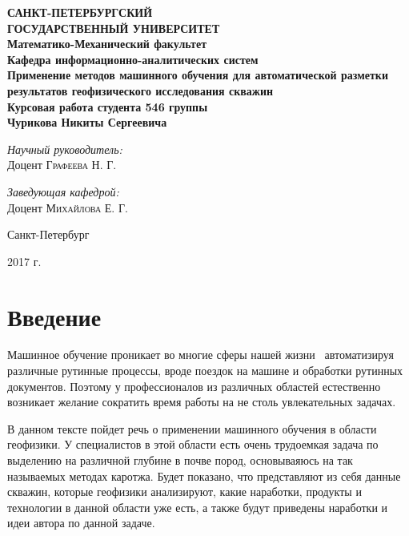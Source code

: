 \documentclass[aps,%
12pt,%
final,%
oneside,
onecolumn,%
musixtex, %
superscriptaddress,%
centertags]{article} %
\begin{document}
\begin{titlepage}
\begin{center}
\textbf{\Large САНКТ-ПЕТЕРБУРГСКИЙ \\ ГОСУДАРСТВЕННЫЙ УНИВЕРСИТЕТ} \\[1.0cm]
\textbf{\large Математико-Механический факультет} \\[0.2cm]
\textbf{\large Кафедра информационно-аналитических систем}\\[3.5cm]

\textbf{\LARGE Применение методов машинного обучения для автоматической разметки результатов геофизического исследования скважин}\\[1.0cm]
\textbf{\Large Курсовая работа студента 546 группы} \\[0.2cm]
\textbf{\Large Чурикова Никиты Сергеевича} \\[3.5cm]

\begin{flushright} \large
\emph{Научный руководитель:} \\
Доцент \textsc{Графеева Н. Г.}
\end{flushright}
\begin{flushright} \large
\emph{Заведующая кафедрой:} \\
Доцент \textsc{Михайлова Е. Г.}
\end{flushright}
\vfill

{\large {Санкт-Петербург}} \par
{\large {2017 г.}}
\end{center}
\end{titlepage}

\tableofcontents

\section{Введение}
Машинное обучение проникает во многие сферы нашей жизни~\cite{overview-of-ml} автоматизируя различные рутинные процессы, вроде поездок на машине и обработки рутинных документов. Поэтому у профессионалов из различных областей естественно возникает желание сократить время работы на не столь увлекательных задачах.

В данном тексте пойдет речь о применении машинного обучения в области геофизики. У специалистов в этой области есть очень трудоемкая задача по выделению на различной глубине в почве пород, основываяюсь на так называемых методах каротжа. Будет показано, что представляют из себя данные скважин, которые геофизики анализируют, какие наработки, продукты и технологии в данной области уже есть, а также будут приведены наработки и идеи автора по данной задаче.
\end{document}
